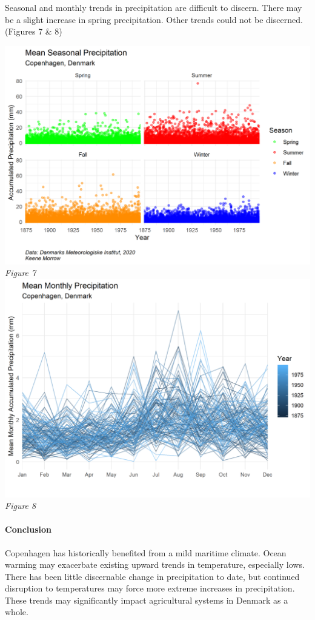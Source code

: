 \documentclass[
]{article}
\let\oldparagraph\paragraph
\renewcommand{\paragraph}[1]{\oldparagraph{#1}\mbox{}}
\begin{document}
Seasonal and monthly trends in precipitation are difficult to discern.
There may be a slight increase in spring precipitation. Other trends
could not be discerned. (Figures 7 \& 8)

\includegraphics{figures/mean_season_precip.png} \emph{Figure 7}
\includegraphics{figures/mean_month_precip.png} \emph{Figure 8}

\hypertarget{conclusion}{%
\paragraph{Conclusion}\label{conclusion}}

Copenhagen has historically benefited from a mild maritime climate.
Ocean warming may exacerbate existing upward trends in temperature,
especially lows. There has been little discernable change in
precipitation to date, but continued disruption to temperatures may
force more extreme increases in precipitation. These trends may
significantly impact agricultural systems in Denmark as a whole.
\end{document}
